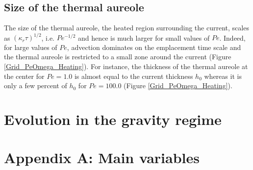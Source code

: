 \subsection{Size of the thermal aureole}
\label{sec:char-therm-anom}

The size  of the  thermal aureole, the  heated region  surrounding the
current,  scales as  $(\kappa_r  \tau)^{1/2}$,  i.e.  $Pe^{-1/2}$  and
hence is  much larger  for small  values of  $Pe$.  Indeed,  for large
values of $Pe$, advection dominates  on the emplacement time scale and
the thermal aureole  is restricted to a small zone  around the current
(Figure  \ref{Grid_PeOmega_Heating}). For  instance, the  thickness of
the thermal aureole at the center  for $Pe=1.0$ is almost equal to the
current thickness $h_0$ whereas it is  only a few percent of $h_0$ for
$Pe=100.0$ (Figure \ref{Grid_PeOmega_Heating}).

\section{Evolution in the gravity regime}
\label{sec:evol-grav-regime}


\section*{Appendix A: Main variables}
 \label{Heat:AppendixA}

